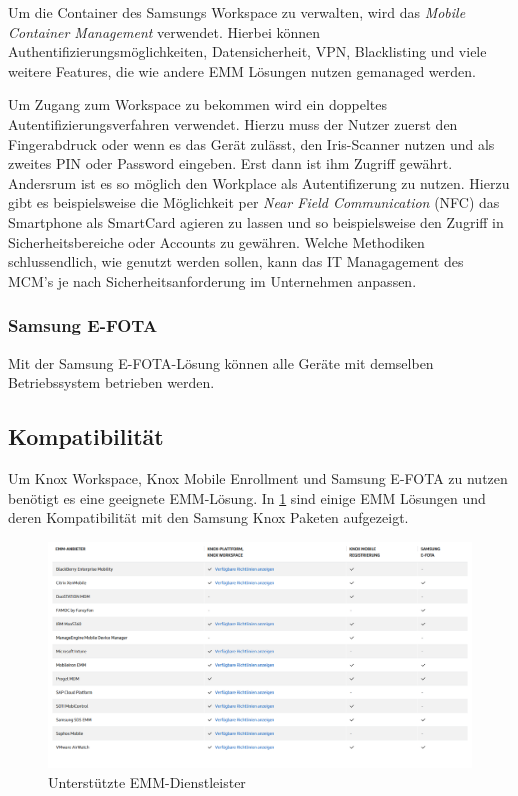 Um die Container des Samsungs Workspace zu verwalten, wird das \textit{Mobile Container Management} verwendet. Hierbei können Authentifizierungsmöglichkeiten, Datensicherheit,  VPN, Blacklisting und viele weitere Features, die wie andere EMM Lösungen nutzen gemanaged werden.

Um Zugang zum Workspace zu bekommen wird ein doppeltes Autentifizierungsverfahren verwendet. Hierzu muss der Nutzer zuerst den Fingerabdruck oder wenn es das Gerät zulässt, den Iris-Scanner nutzen und als zweites PIN oder Password eingeben. Erst dann ist ihm Zugriff gewährt.
Andersrum ist es so möglich den Workplace als Autentifizerung zu nutzen. Hierzu gibt es beispielsweise die Möglichkeit per \textit{Near Field Communication} (NFC) das Smartphone als SmartCard agieren zu lassen und so beispielsweise den Zugriff in Sicherheitsbereiche oder Accounts zu gewähren.
Welche Methodiken schlussendlich, wie genutzt werden sollen, kann das IT Managagement des MCM's je nach Sicherheitsanforderung im Unternehmen anpassen.

\subsubsection{Samsung E-FOTA}
Mit der Samsung E-FOTA-Lösung können alle Geräte mit demselben Betriebssystem betrieben werden.


\subsection{Kompatibilität}
Um Knox Workspace, Knox Mobile Enrollment und Samsung E-FOTA zu nutzen benötigt es eine geeignete EMM-Lösung. In \cref{fig:SamKno3} sind einige EMM Lösungen und deren Kompatibilität mit den Samsung Knox Paketen aufgezeigt.
\begin{figure}[hbt]
\centering
\includegraphics[width=1\textwidth]{Bilder/sk_3}
\caption{Unterstützte EMM-Dienstleister}\label{fig:SamKno3}
\end{figure}

